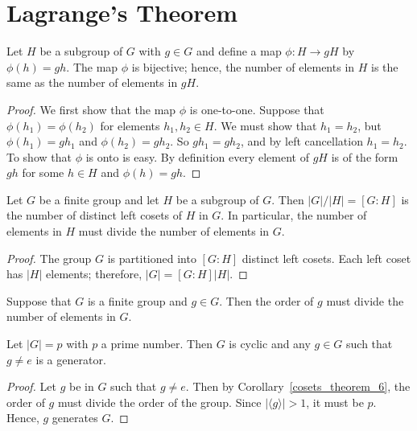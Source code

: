  
\section{Lagrange's Theorem}

\begin{proposition}\label{cosets_theorem_4}
Let $H$ be a subgroup of $G$ with $g \in G$ and define a map $\phi:H \rightarrow gH$ by $\phi(h) = gh$.  The map $\phi$ is bijective; hence, the number of elements in $H$ is the same as the number of elements in $gH$. 
\end{proposition}
 
\begin{proof}
We first show that the map $\phi$ is one-to-one.  Suppose that $\phi(h_1)  = \phi(h_2)$ for elements $h_1, h_2 \in H$.  We must show that $h_1 =  h_2$, but $\phi(h_1) = gh_1$ and $\phi(h_2) = gh_2$.  So $gh_1 = gh_2$,  and by left cancellation $h_1= h_2$.  To show that $\phi$ is onto is easy.  By definition every element of $gH$ is of the form $gh$ for some $h \in H$ and $\phi(h) = gh$. 
\end{proof}

\begin{theorem}[Lagrange]\label{cosets_theorem_5}
Let $G$ be a finite group and let $H$ be a subgroup of $G$.  Then $|G|/|H| = [G : H]$ is the number of distinct left cosets of $H$ in $G$.  In particular, the number of elements in $H$ must divide the number of elements in $G$. 
\end{theorem}

\begin{proof}
The group $G$ is partitioned into $[G : H]$ distinct left cosets.  Each left coset has $|H|$ elements; therefore, $|G| = [G : H] |H|$.
\end{proof}

\begin{corollary}\label{cosets_theorem_6}
Suppose that $G$ is a finite group and $g \in G$.  Then the order of $g$ must divide the number of elements in $G$. 
\end{corollary}

\begin{corollary}\label{cosets_theorem_7}
Let $|G| = p$ with $p$ a prime number.  Then $G$ is cyclic and any $g \in G$ such that $g \neq e$ is a generator. 
\end{corollary}

 
\begin{proof}
Let $g$ be in $G$ such that $g \neq e$.  Then by Corollary~\ref{cosets_theorem_6}, the order of $g$ must divide the order of the group. Since $|\langle g \rangle| > 1$, it must be $p$.  Hence, $g$ generates $G$. 
\end{proof}

